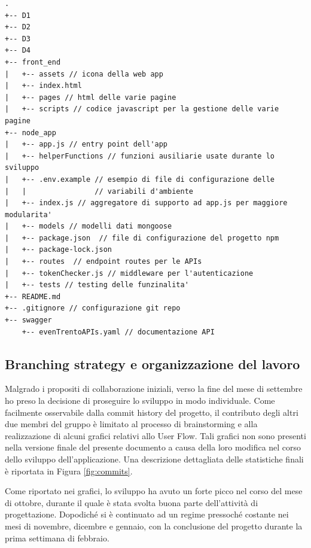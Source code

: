 \documentclass[9pt]{extarticle}
\begin{document}
\begin{lstlisting}[style=treestyle, caption=Struttura della repository]
.
+-- D1
+-- D2
+-- D3
+-- D4
+-- front_end
|   +-- assets // icona della web app
|   +-- index.html
|   +-- pages // html delle varie pagine
|   +-- scripts // codice javascript per la gestione delle varie pagine
+-- node_app
|   +-- app.js // entry point dell'app
|   +-- helperFunctions // funzioni ausiliarie usate durante lo sviluppo
|   +-- .env.example // esempio di file di configurazione delle
|   |                // variabili d'ambiente
|   +-- index.js // aggregatore di supporto ad app.js per maggiore modularita'
|   +-- models // modelli dati mongoose
|   +-- package.json  // file di configurazione del progetto npm
|   +-- package-lock.json
|   +-- routes  // endpoint routes per le APIs
|   +-- tokenChecker.js // middleware per l'autenticazione
|   +-- tests // testing delle funzinalita'
+-- README.md
+-- .gitignore // configurazione git repo
+-- swagger
    +-- evenTrentoAPIs.yaml // documentazione API
\end{lstlisting}


\subsection{Branching strategy e organizzazione del lavoro}

Malgrado i propositi di collaborazione iniziali, verso la fine del mese di
settembre ho preso la decisione di proseguire lo sviluppo in modo individuale.
Come facilmente osservabile dalla commit history del progetto, il contributo
degli altri due membri del gruppo è limitato al processo di brainstorming e
alla realizzazione di alcuni grafici relativi allo User Flow. Tali grafici non
sono presenti nella versione finale del presente documento a causa della loro
modifica nel corso dello sviluppo dell'applicazione. Una descrizione dettagliata
delle statistiche finali è riportata in Figura \ref{fig:commits}. 

Come riportato nei grafici, lo sviluppo ha avuto un forte picco nel corso del mese di ottobre, durante
il quale è stata svolta buona parte dell'attività di progettazione. Dopodiché si è continuato ad un regime pressoché costante nei mesi di novembre, dicembre e gennaio, con la conclusione del progetto durante la prima settimana di febbraio.

\newpage


\end{document}
